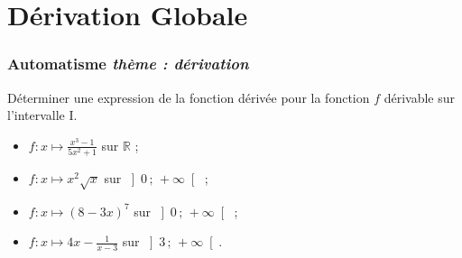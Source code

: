 \documentclass[11pt]{beamer}
\newcommand{\R}{\mathbb{R}}
\newcommand{\Interoo}[2]{\left]#1\, ;\, #2\right[}
\newcounter{autocompteur}
\newcommand{\automatisme}[1]{\addtocounter{autocompteur}{1}\frametitle{Automatisme  \theautocompteur  \textit{ thème : #1}}}
\begin{document}
\section{Dérivation Globale}

\label{derivationglobale}

\begin{frame}
\automatisme{dérivation}

Déterminer une expression de la fonction dérivée pour la fonction $f$ dérivable sur l'intervalle I.
\begin{itemize}
\item $f:x \mapsto \frac{x^3-1}{5x^{2}+1}$ sur $\R$ ;
 \item $f:x \mapsto x^2\sqrt{x}$ sur $\Interoo{0}{+\infty}$ ;
 \item $f:x \mapsto \left(8-3x\right)^{7}$ sur $\Interoo{0}{+\infty}$ ; 
 \item $f:x \mapsto 4x-\frac{1}{x-3}$ sur $\Interoo{3}{+\infty}$.
\end{itemize}

\end{frame}
\end{document}
